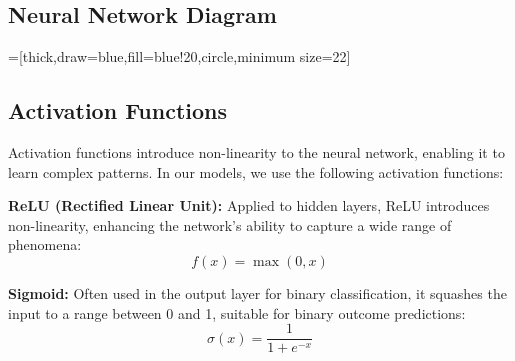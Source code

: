 \documentclass{article}
\begin{document}
\subsection{Neural Network Diagram}





=[thick,draw=blue,fill=blue!20,circle,minimum size=22]



\subsection{Activation Functions}
Activation functions introduce non-linearity to the neural network, enabling it to learn complex patterns. In our models, we use the following activation functions:

\textbf{ReLU (Rectified Linear Unit):} Applied to hidden layers, ReLU introduces non-linearity, enhancing the network's ability to capture a wide range of phenomena:
\begin{equation}
f(x) = \max(0, x)
\end{equation}

\textbf{Sigmoid:} Often used in the output layer for binary classification, it squashes the input to a range between 0 and 1, suitable for binary outcome predictions:
\begin{equation}
\sigma(x) = \frac{1}{1 + e^{-x}}
\end{equation}
\end{document}
